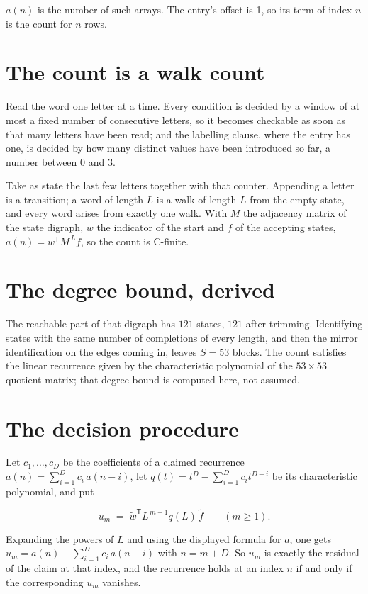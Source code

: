 \documentclass[11pt]{article}
\theoremstyle{definition}
\begin{document}
$a(n)$ is the number of such arrays. The entry's offset is 1, so its term of index $n$ is the count for $n$ rows.

\section{The count is a walk count}

Read the word one letter at a time. Every condition is decided by a window of at most a fixed number of consecutive letters, so it becomes checkable as soon as that many letters have been read; and the labelling clause, where the entry has one, is decided by how many distinct values have been introduced so far, a number between $0$ and 3.

Take as state the last few letters together with that counter. Appending a letter is a transition; a word of length $L$ is a walk of length $L$ from the empty state, and every word arises from exactly one walk. With $M$ the adjacency matrix of the state digraph, $w$ the indicator of the start and $f$ of the accepting states, $a(n) = w^{\mathsf T}M^{\,L}f$, so the count is C-finite.

\section{The degree bound, derived}

The reachable part of that digraph has $121$ states, $121$ after trimming. Identifying states with the same number of completions of every length, and then the mirror identification on the edges coming in, leaves $S = 53$ blocks. The count satisfies the linear recurrence given by the characteristic polynomial of the $53\times53$ quotient matrix; that degree bound is computed here, not assumed.

\section{The decision procedure}

Let $c_1,\dots,c_D$ be the coefficients of a claimed recurrence $a(n) = \sum_{i=1}^{D} c_i\,a(n-i)$, let $q(t) = t^{D} - \sum_{i=1}^{D} c_i t^{D-i}$ be its characteristic polynomial, and put

\[u_m \;=\; \tilde w^{\mathsf T} L^{\,m-1} q(L)\,\tilde f \qquad (m \ge 1).\]

Expanding the powers of $L$ and using the displayed formula for $a$, one gets $u_m = a(n) - \sum_{i=1}^{D} c_i\,a(n-i)$ with $n = m + D$. So $u_m$ is exactly the residual of the claim at that index, and the recurrence holds at an index $n$ if and only if the corresponding $u_m$ vanishes.
\end{document}
